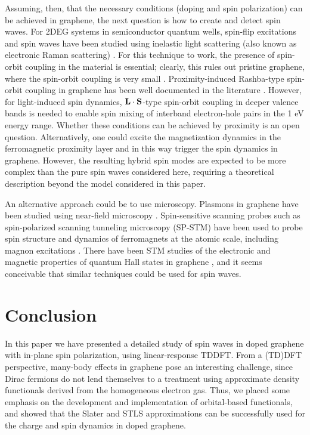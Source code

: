 \documentclass[aps,prb,twocolumn,superscriptaddress]{revtex4-2}
\begin{document}
Assuming, then, that the necessary conditions (doping and spin polarization) can be achieved in graphene,
the next question is how to create and detect spin waves.
For 2DEG systems in semiconductor quantum wells, spin-flip excitations and spin waves have been studied using
inelastic light scattering (also known as electronic Raman scattering)
\cite{Jusserand1992,Jusserand1993,Perez2007,Perez2009,Baboux2012,Baboux2013,Perez2016,Kung2017}.
For this technique to work, the presence of spin-orbit coupling in the material is essential; clearly, this
rules out pristine graphene, where the spin-orbit coupling is very small \cite{Neto2009}.
Proximity-induced Rashba-type spin-orbit coupling in graphene has been well documented in the literature \cite{Dedkov2008,Wang2016,Avsar2020}.
However, for light-induced spin dynamics, ${\bf L}\cdot {\bf S}$-type spin-orbit coupling in deeper valence bands is needed to enable
spin mixing of interband electron-hole pairs in the 1 eV energy range. Whether these conditions can be achieved by proximity is an open question.
Alternatively, one could excite the magnetization dynamics in the ferromagnetic proximity layer and in this way trigger the
spin dynamics in graphene. However, the resulting hybrid spin modes are expected to be more complex than the pure spin waves considered here, requiring a
theoretical description beyond the model considered in this paper.

An alternative approach could be to use microscopy. Plasmons in graphene have been studied using near-field microscopy \cite{Brar2010,Chen2012,Fei2012}.
Spin-sensitive scanning probes such as spin-polarized scanning tunneling microscopy (SP-STM) \cite{Wiesendanger2009} have been used to
probe spin structure and dynamics of ferromagnets at the atomic scale, including magnon excitations \cite{Balashov2006,Khajetoorians2011,Gao2018}.
There have been STM studies of the electronic and magnetic properties of quantum Hall states in graphene \cite{Song2010,Miller2010,Kim2021},
and it seems conceivable that similar techniques could be used for spin waves.

\section{Conclusion}\label{sec5}

In this paper we have presented a detailed study of spin waves in doped graphene with in-plane spin polarization, using
linear-response TDDFT. From a (TD)DFT perspective, many-body effects in graphene pose an interesting challenge, since
Dirac fermions do not lend themselves to a treatment using approximate density functionals derived from the homogeneous electron gas.
Thus, we placed some emphasis on the development and implementation of orbital-based functionals, and showed that the Slater and STLS approximations
can be successfully used for the charge and spin dynamics in doped graphene.
\end{document}
